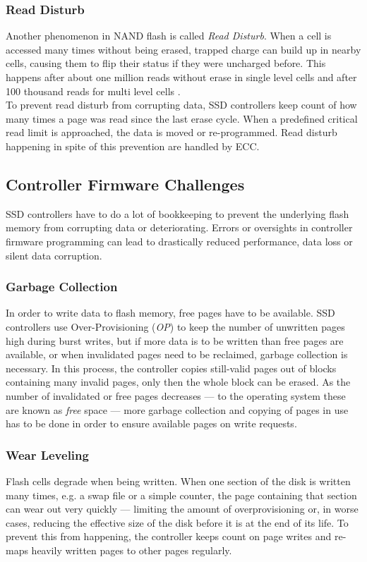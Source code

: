 \documentclass{acm_proc_article-sp}
\begin{document}
\subsubsection*{Read Disturb}
Another phenomenon in NAND flash is called \emph{Read Disturb}. When a cell is accessed many times without being erased, trapped charge can build up in nearby cells, causing them to flip their status if they were uncharged before.
This happens after about one million reads without erase in single level cells and after 100 thousand reads for multi level cells \cite{cooke2007inconvenient}.
\\
To prevent read disturb from corrupting data, SSD controllers keep count of how many times a page was read since the last erase cycle. When a predefined critical read limit is approached, the data is moved or re-programmed. Read disturb happening in spite of this prevention are handled by ECC.

\subsection{Controller Firmware Challenges}
SSD controllers have to do a lot of bookkeeping to prevent the underlying flash memory from corrupting data or deteriorating. Errors or oversights in controller firmware programming can lead to drastically reduced performance, data loss or silent data corruption.

\subsubsection*{Garbage Collection}
In order to write data to flash memory, free pages have to be available. SSD controllers use Over-Provisioning (\emph{OP}) to keep the number of unwritten pages high during burst writes, but if more data is to be written than free pages are available, or when invalidated pages need to be reclaimed, garbage collection is necessary. In this process, the controller copies still-valid pages out of blocks containing many invalid pages, only then the whole block can be erased. As the number of invalidated or free pages decreases --- to the operating system these are known as \emph{free} space --- more garbage collection and copying of pages in use has to be done in order to ensure available pages on write requests.

\subsubsection*{Wear Leveling}
Flash cells degrade when being written. When one section of the disk is written many times, e.g. a swap file or a simple counter, the page containing that section can wear out very quickly --- limiting the amount of overprovisioning or, in worse cases, reducing the effective size of the disk before it is at the end of its life. To prevent this from happening, the controller keeps count on page writes and re-maps heavily written pages to other pages regularly.
\end{document}
